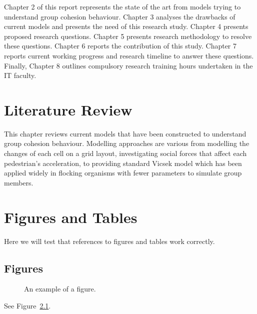 \documentclass[a4paper,11pt,phdthesis,singlespace,twoside]{cssethesis}
\begin{document}
Chapter 2 of this report represents the state of the art from models trying to understand group cohesion behaviour. Chapter 3 analyses the drawbacks of current models and presents the need of this research study. Chapter 4 presents proposed research questions. Chapter 5 presents research methodology to resolve these questions. Chapter 6 reports the contribution of this study. Chapter 7 reports current working progress and research timeline to answer these questions. Finally, Chapter 8 outlines compulsory research training hours undertaken in the IT faculty.

\chapter{Literature Review}

This chapter reviews current models that have been constructed to understand group cohesion behaviour. Modelling approaches are various from modelling the changes of each cell on a grid layout, investigating social forces that affect each pedestrian’s acceleration, to providing standard Vicsek model which has been applied widely in flocking organisms with fewer parameters to simulate group members.

\chapter{Figures and Tables}
Here we will test that references to figures and tables work correctly.

\section{Figures}
\begin{figure}[ht]
\begin{center}
\end{center}
\caption{An example of a figure.}
\label{fig:example}
\end{figure}
See Figure~\ref{fig:example}.
\end{document}

